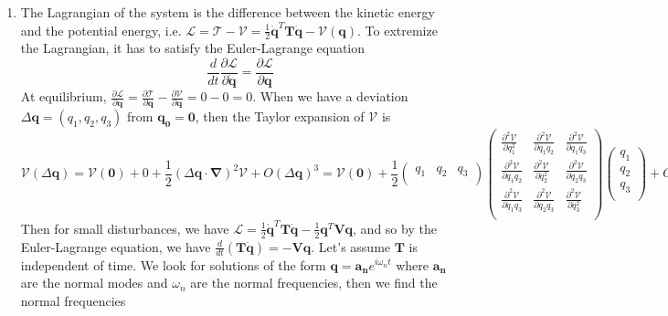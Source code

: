 \documentclass[a4paper]{article}
\begin{document}
\begin{ans}\leavevmode
\begin{enumerate}[label=(\roman*)]
\item The Lagrangian of the system is the difference between the kinetic energy and the potential energy, i.e. $\mathcal{L}=\mathcal{T}-\mathcal{V}=\frac{1}{2}\mathbf{\dot{q}}^T\mathbf{T}\mathbf{\dot{q}}-\mathcal{V}(\mathbf{q})$. To extremize the Lagrangian, it has to satisfy the Euler-Lagrange equation
$$\frac{d}{dt}\frac{\partial\mathcal{L}}{\partial\mathbf{\dot{q}}}=\frac{\partial\mathcal{L}}{\partial\mathbf{q}}$$
At equilibrium, $\frac{\partial\mathcal{L}}{\partial\mathbf{q}}=\frac{\partial\mathcal{T}}{\partial\mathbf{q}}-\frac{\partial\mathcal{V}}{\partial\mathbf{q}}=0-0=0$. When we have a deviation $\Delta\mathbf{q}=(q_1,q_2,q_3)$ from $\mathbf{q_0}=\boldsymbol{0}$, then the Taylor expansion of $\mathcal{V}$ is
$$\mathcal{V}(\Delta\mathbf{q})=\mathcal{V}(\boldsymbol{0})+0+\frac{1}{2}(\Delta\mathbf{q}\cdot\boldsymbol{\nabla})^2\mathcal{V}+O(\Delta\mathbf{q})^3=\mathcal{V}(\boldsymbol{0})+\frac{1}{2}\begin{pmatrix}q_1&q_2&q_3\\\end{pmatrix}\begin{pmatrix}\frac{\partial^2\mathcal{V}}{\partial q_1^2}&\frac{\partial^2\mathcal{V}}{\partial q_1q_2}&\frac{\partial^2\mathcal{V}}{\partial q_1q_3}\\\frac{\partial^2\mathcal{V}}{\partial q_1q_2}&\frac{\partial^2\mathcal{V}}{\partial q_2^2}&\frac{\partial^2\mathcal{V}}{\partial q_2q_3}\\\frac{\partial^2\mathcal{V}}{\partial q_1q_3}&\frac{\partial^2\mathcal{V}}{\partial q_2q_3}&\frac{\partial^2\mathcal{V}}{\partial q_3^2}\\\end{pmatrix}\begin{pmatrix}q_1\\q_2\\q_3\\\end{pmatrix}+O(\Delta\mathbf{q}^2)$$
Then for small disturbances, we have $\mathcal{L}=\frac{1}{2}\mathbf{\dot{q}}^T\mathbf{T}\mathbf{\dot{q}}-\frac{1}{2}\mathbf{q}^T\mathbf{V}\mathbf{q}$, and so by the Euler-Lagrange equation, we have $\frac{d}{dt}(\mathbf{T\dot{q}})=-\mathbf{Vq}$. Let's assume $\mathbf{T}$ is independent of time. We look for solutions of the form $\mathbf{q}=\mathbf{a_n}e^{i\omega_nt}$ where $\mathbf{a_n}$ are the normal modes and $\omega_n$ are the normal frequencies, then we find the normal frequencies

\end{enumerate}
\end{ans}
\end{document}

